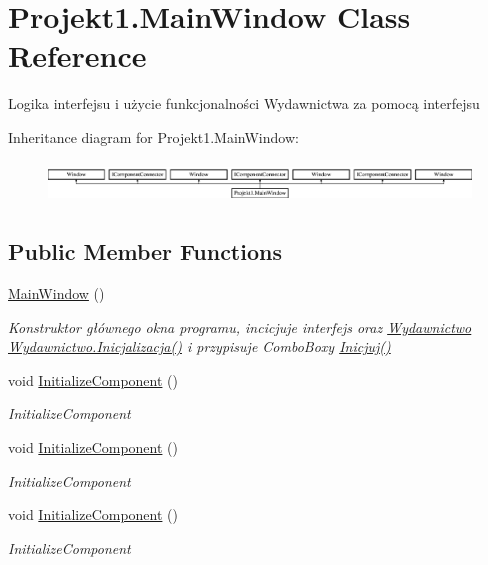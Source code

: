 \hypertarget{class_projekt1_1_1_main_window}{}\section{Projekt1.\+Main\+Window Class Reference}
\label{class_projekt1_1_1_main_window}


Logika interfejsu i użycie funkcjonalności Wydawnictwa za pomocą interfejsu  


Inheritance diagram for Projekt1.\+Main\+Window\+:\begin{figure}[H]
\begin{center}
\leavevmode
\includegraphics[height=1.103448cm]{class_projekt1_1_1_main_window}
\end{center}
\end{figure}
\subsection*{Public Member Functions}
\begin{DoxyCompactItemize}
\item 
\mbox{\hyperlink{class_projekt1_1_1_main_window_a70bc493e483144ca288af18f3f9ee7fb}{Main\+Window}} ()
\begin{DoxyCompactList}\small\item\em Konstruktor głównego okna programu, incicjuje interfejs oraz \mbox{\hyperlink{class_projekt1_1_1_wydawnictwo}{Wydawnictwo}} \mbox{\hyperlink{class_projekt1_1_1_wydawnictwo_a5831651945cb56c52d8619a3167693ce}{Wydawnictwo.\+Inicjalizacja()}} i przypisuje Combo\+Boxy \mbox{\hyperlink{class_projekt1_1_1_main_window_afdda85a4d4f8eaa2014fdf0bc313af58}{Inicjuj()}} \end{DoxyCompactList}\item 
void \mbox{\hyperlink{class_projekt1_1_1_main_window_a3057345890f0202534dd2144a741ca57}{Initialize\+Component}} ()
\begin{DoxyCompactList}\small\item\em Initialize\+Component \end{DoxyCompactList}\item 
void \mbox{\hyperlink{class_projekt1_1_1_main_window_a3057345890f0202534dd2144a741ca57}{Initialize\+Component}} ()
\begin{DoxyCompactList}\small\item\em Initialize\+Component \end{DoxyCompactList}\item 
void \mbox{\hyperlink{class_projekt1_1_1_main_window_a3057345890f0202534dd2144a741ca57}{Initialize\+Component}} ()
\begin{DoxyCompactList}\small\item\em Initialize\+Component \end{DoxyCompactList}\end{DoxyCompactItemize}
